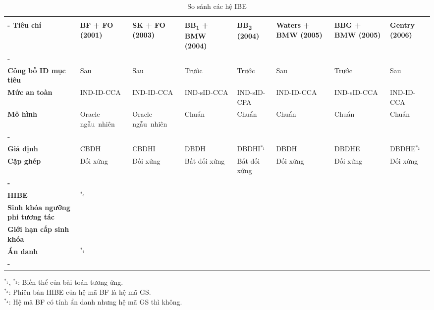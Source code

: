 \baselineskip
\small
\begin{longtabu}{| >{\bfseries\centering}p{2cm} X[c] X[c] X[c] X[c] X[c] X[c] X[c] |}
	\captionsetup{font=normalsize}
	\caption{So sánh các hệ IBE} \\
	\tabucline[4pt]-
	\everyrow{\tabucline[1pt]-}
	Tiêu chí &
	\bfseries BF 					\newline + FO 	\newline (2001) &
	\bfseries SK 					\newline + FO 	\newline (2003) &
	\bfseries BB\textsubscript{1} 	\newline + BMW 	\newline (2004) &
	\bfseries BB\textsubscript{2} 	\newline		\newline (2004) &
	\bfseries Waters 				\newline + BMW 	\newline (2005) &
	\bfseries BBG 					\newline + BMW 	\newline (2005) &
	\bfseries Gentry 				\newline		\newline (2006) \\
	\tabucline[1pt]-
	 \\
	Công bố ID mục tiêu 	& Sau 					& Sau 					& Trước 		& Trước 		& Sau 			& Trước 		& Sau 				\\
	Mức an toàn 			& IND-ID-CCA 			& IND-ID-CCA 			& IND-sID-CCA 	& IND-sID-CPA 	& IND-ID-CCA 	& IND-sID-CCA 	& IND-ID-CCA 	\\
	Mô hình 				& Oracle ngẫu~nhiên 	& Oracle ngẫu~nhiên 	& Chuẩn 		& Chuẩn 		& Chuẩn 		& Chuẩn 		& Chuẩn 			\\
	\tabucline[1pt]-
	 \\
	Giả định 				& CBDH 					& CBDHI 		& DBDH 			& DBDHI$^{*_1}$ & DBDH 			& DBDHE 		& DBDHE$^{*_2}$ \\
	Cặp ghép				& Đối xứng 				& Đối xứng 		& Bất đối xứng 	& Bất đối xứng 	& Đối xứng 		& Đối xứng 		& Đối xứng 		\\
	\tabucline[1pt]-
	 \\
	HIBE 							& \checkmark$^{*_3}$ 	& & \checkmark 	& & \checkmark 	& \checkmark 	& 				\\
	Sinh khóa ngưỡng phi tương tác 	& \checkmark 			& & \checkmark 	& & \checkmark 	& \checkmark 	& 				\\
	Giới hạn cấp sinh khóa 			& 						& & 			& & 			& \checkmark 	& 				\\
	Ẩn danh 						& \checkmark$^{*_4}$ 	& & 			& & 			& 				& \checkmark 	\\
	\tabucline[2pt]-
\end{longtabu}
\vspace{-\baselineskip}
$^{*_1}$, $^{*_2}$: Biến thể của bài toán tương ứng. \\
\indent $^{*_3}$: Phiên bản HIBE của hệ mã BF là hệ mã GS. \\
\indent $^{*_4}$: Hệ mã BF có tính ẩn danh nhưng hệ mã GS thì không.
\normalsize